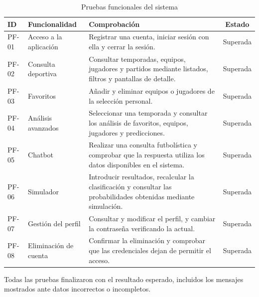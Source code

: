 \begin{table}[H]
    \centering
    \small
    \begin{tabularx}{\textwidth}{|l|p{3cm}|X|c|}
        \hline
        \textbf{ID} & \textbf{Funcionalidad} & \textbf{Comprobación} &
        \textbf{Estado} \\ \hline

        PF-01 & Acceso a la aplicación &
        Registrar una cuenta, iniciar sesión con ella y cerrar la sesión. &
        Superada \\ \hline

        PF-02 & Consulta deportiva &
        Consultar temporadas, equipos, jugadores y partidos mediante listados,
        filtros y pantallas de detalle. &
        Superada \\ \hline

        PF-03 & Favoritos &
        Añadir y eliminar equipos o jugadores de la selección personal. &
        Superada \\ \hline

        PF-04 & Análisis avanzados &
        Seleccionar una temporada y consultar los análisis de favoritos,
        equipos, jugadores y predicciones. &
        Superada \\ \hline

        PF-05 & Chatbot &
        Realizar una consulta futbolística y comprobar que la respuesta utiliza
        los datos disponibles en el sistema. &
        Superada \\ \hline

        PF-06 & Simulador &
        Introducir resultados, recalcular la clasificación y consultar las
        probabilidades obtenidas mediante simulación. &
        Superada \\ \hline

        PF-07 & Gestión del perfil &
        Consultar y modificar el perfil, y cambiar la contraseña verificando la
        actual. &
        Superada \\ \hline

        PF-08 & Eliminación de cuenta &
        Confirmar la eliminación y comprobar que las credenciales dejan de
        permitir el acceso. &
        Superada \\ \hline
    \end{tabularx}
    \caption{Pruebas funcionales del sistema}
    \label{tab:pruebas-funcionales}
\end{table}

Todas las pruebas finalizaron con el resultado esperado, incluidos los mensajes
mostrados ante datos incorrectos o incompletos.

